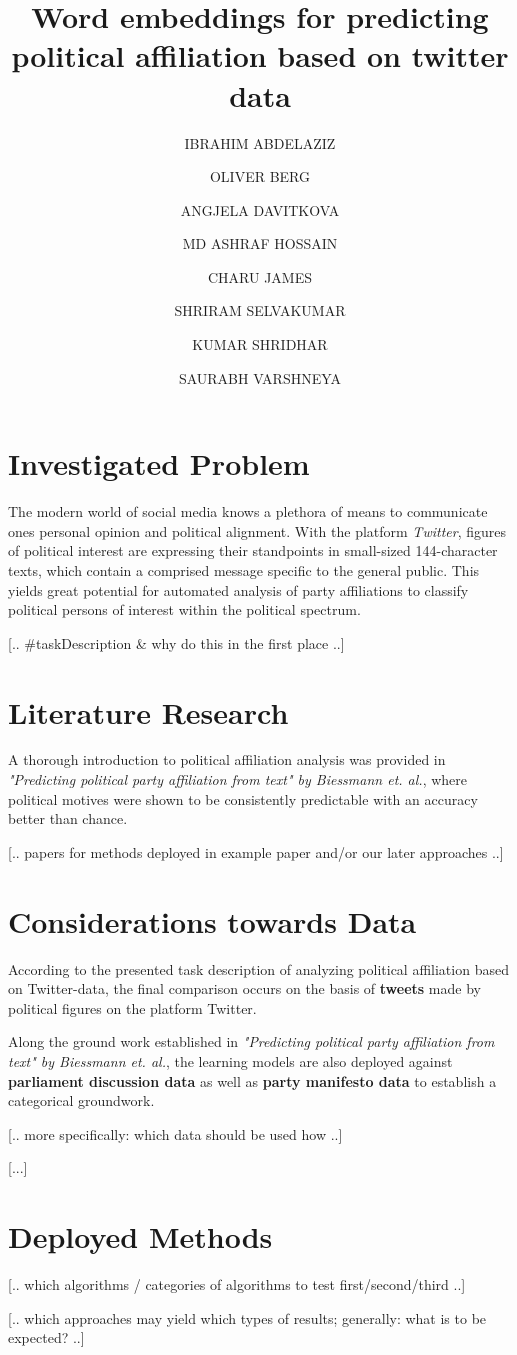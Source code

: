 \documentclass[10pt, oneside]{article}
\title{Word embeddings for predicting political affiliation based on twitter data}
\author[]{IBRAHIM ABDELAZIZ}
\author[]{OLIVER BERG}
\author[]{ANGJELA DAVITKOVA}
\author[]{MD ASHRAF HOSSAIN}
\author[]{CHARU JAMES}
\author[]{SHRIRAM SELVAKUMAR}
\author[]{KUMAR SHRIDHAR}
\author[]{SAURABH VARSHNEYA}
\affil[1]{Technische Universität Kaiserslautern}
\begin{document}
\maketitle



\section{Investigated Problem}

The modern world of social media knows a plethora of means to communicate ones personal opinion and political alignment. With the platform \textit{Twitter}, figures of political interest are expressing their standpoints in small-sized 144-character texts, which contain a comprised message specific to the general public. This yields great potential for automated analysis of party affiliations to classify political persons of interest within the political spectrum.

[.. \#taskDescription \& why do this in the first place ..]



\section{Literature Research}

A thorough introduction to political affiliation analysis was provided in \textit{"Predicting political party affiliation from text" by Biessmann et. al.}, where political motives were shown to be consistently predictable with an accuracy better than chance. 

[.. papers for methods deployed in example paper and/or our later approaches ..]



\section{Considerations towards Data}

According to the presented task description of analyzing political affiliation based on Twitter-data, the final comparison occurs on the basis of \textbf{tweets} made by political figures on the platform Twitter.

Along the ground work established in \textit{"Predicting political party affiliation from text" by Biessmann et. al.}, the learning models are also deployed against \textbf{parliament discussion data} as well as \textbf{party manifesto data} to establish a categorical groundwork.

[.. more specifically: which data should be used how ..]

[...]



\section{Deployed Methods}

[.. which algorithms / categories of algorithms to test first/second/third ..]

[.. which approaches may yield which types of results; generally: what is to be expected? ..]
\end{document}
